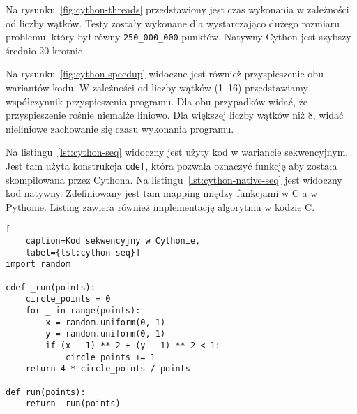 \begin{figure*}
    \centering
    \begin{minipage}[b]{.45\textwidth}
        \centering
        
        \caption{Czas wykonania algorytmu w Cythonie w zależności od liczby wątków}
        \label{fig:cython-threads}
    \end{minipage}
    \hfill
    \begin{minipage}[b]{.45\textwidth}
        \centering
        
        \caption{Przyspieszenie liczenia liczby $\pi$ w Cythonie}
        \label{fig:cython-speedup}
    \end{minipage}
\end{figure*}

Na rysunku~\ref{fig:cython-threads} przedstawiony jest czas wykonania
w zależności od liczby wątków.
Testy zostały wykonane dla wystarczająco dużego rozmiaru problemu,
który był równy \texttt{250\_000\_000} punktów.
Natywny Cython jest szybszy średnio 20 krotnie.

Na rysunku~\ref{fig:cython-speedup} widoczne jest również przyspieszenie
obu wariantów kodu.
W zależności od liczby wątków (1--16) przedstawiamy współczynnik
przyspieszenia programu.
Dla obu przypadków widać, że przyspieszenie rośnie niemalże liniowo.
Dla większej liczby wątków niż 8, widać nieliniowe zachowanie się czasu
wykonania programu.

Na listingu~\ref{lst:cython-seq} widoczny jest użyty kod w wariancie
sekwencyjnym.
Jest tam użyta konstrukcja \texttt{cdef}, która pozwala
oznaczyć funkcję aby została skompilowana przez Cythona.
Na listingu~\ref{lst:cython-native-seq} jest widoczny kod
natywny.
Zdefiniowany jest tam mapping między funkcjami w C a w Pythonie.
Listing zawiera również implementację algorytmu w kodzie C\@.

\noindent\begin{minipage}{\columnwidth}
\begin{lstlisting}[
    caption=Kod sekwencyjny w Cythonie,
    label={lst:cython-seq}]
import random

cdef _run(points):
    circle_points = 0
    for _ in range(points):
        x = random.uniform(0, 1)
        y = random.uniform(0, 1)
        if (x - 1) ** 2 + (y - 1) ** 2 < 1:
            circle_points += 1
    return 4 * circle_points / points

def run(points):
    return _run(points)
\end{lstlisting}
\end{minipage}

